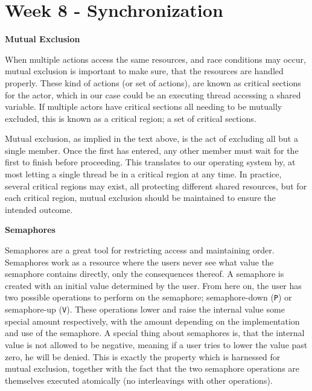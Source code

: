 \section{Week 8 - Synchronization}

    
    

\textbf{Mutual Exclusion}

When multiple actions access the same resources, and race conditions may occur, mutual exclusion is important to make sure, that the resources are handled properly. These kind of actions (or set of actions), are known as critical sections for the actor, which in our case could be an executing thread accessing a shared variable. If multiple actors have critical sections all needing to be mutually excluded, this is known as a critical region; a set of critical sections. 

Mutual exclusion, as implied in the text above, is the act of excluding all but a single member. Once the first has entered, any other member must wait for the first to finish before proceeding. This translates to our operating system by, at most letting a single thread be in a critical region at any time. In practice, several critical regions may exist, all protecting different shared resources, but for each critical region, mutual exclusion should be maintained to ensure the intended outcome. 

\textbf{Semaphores}

Semaphores are a great tool for restricting access and maintaining order. Semaphores work as a resource where the users never see what value the semaphore contains directly, only the consequences thereof. A semaphore is created with an initial value determined by the user. From here on, the user has two possible operations to perform on the semaphore; semaphore-down (\texttt{P}) or semaphore-up (\texttt{V}). These operations lower and raise the internal value some special amount respectively, with the amount depending on the implementation and use of the semaphore. A special thing about semaphores is, that the internal value is not allowed to be negative, meaning if a user tries to lower the value past zero, he will be denied. This is exactly the property which is harnessed for mutual exclusion, together with the fact that the two semaphore operations are themselves executed atomically (no interleavings with other operations). 

